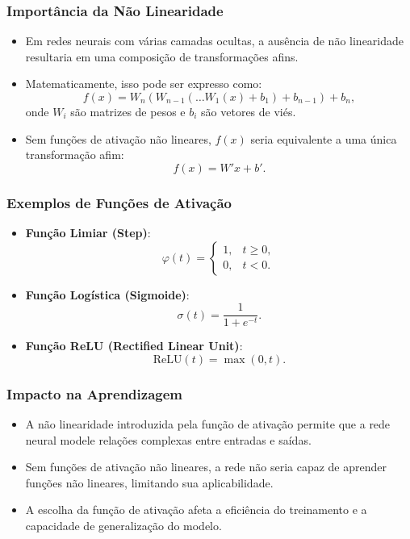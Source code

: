 \documentclass[aspectratio=169]{beamer}
\begin{document}
\begin{frame}
\frametitle{Importância da Não Linearidade}
\begin{itemize}
    \item Em redes neurais com várias camadas ocultas, a ausência de não linearidade resultaria em uma composição de transformações afins.
    \item Matematicamente, isso pode ser expresso como:
    \[
    f(x) = W_n(W_{n-1}(\dots W_1(x) + b_1) + b_{n-1}) + b_n,
    \]
    onde \( W_i \) são matrizes de pesos e \( b_i \) são vetores de viés.
    \item Sem funções de ativação não lineares, \( f(x) \) seria equivalente a uma única transformação afim:
    \[
    f(x) = W'x + b'.
    \]
\end{itemize}
\end{frame}

\begin{frame}
\frametitle{Exemplos de Funções de Ativação}
\begin{itemize}
    \item \textbf{Função Limiar (Step)}:
    \[
    \varphi(t) = \begin{cases}
    1, & t \geq 0, \\
    0, & t < 0.
    \end{cases}
    \]
    \item \textbf{Função Logística (Sigmoide)}:
    \[
    \sigma(t) = \frac{1}{1 + e^{-t}}.
    \]
    \item \textbf{Função ReLU (Rectified Linear Unit)}:
    \[
    \text{ReLU}(t) = \max(0, t).
    \]
\end{itemize}
\end{frame}

\begin{frame}
\frametitle{Impacto na Aprendizagem}
\begin{itemize}
    \item A não linearidade introduzida pela função de ativação permite que a rede neural modele relações complexas entre entradas e saídas.
    \item Sem funções de ativação não lineares, a rede não seria capaz de aprender funções não lineares, limitando sua aplicabilidade.
    \item A escolha da função de ativação afeta a eficiência do treinamento e a capacidade de generalização do modelo.
\end{itemize}
\end{frame}
\end{document}
